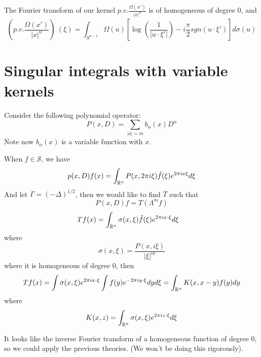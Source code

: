 \begin{theorem}
    The Fourier transform of our kernel $p.v.\frac{\Omega(x')}{|x|^n}$ is of homogeneous of degree 0, and
    \begin{equation*}
        \left(p.v.\frac{\Omega(x')}{|x|^n}\right)^{\widehat{\phantom{.}}}(\xi)=\int_{S^{n-1}}\Omega(u)\left[\log\left(\frac{1}{|u\cdot\xi'|}\right)-i\frac{\pi}{2}sgn(u\cdot\xi')\right]d\sigma(u)
    \end{equation*}
\end{theorem}



\section{Singular integrals with variable kernels}
Consider the following polynomial operator:
\begin{equation*}
    P(x,D)=\sum_{|a|=m}b_\alpha(x) D^\alpha
\end{equation*}
Note now $b_\alpha(x)$ is a variable function with $x$.

When $f\in\mathcal{S}$, we have
\begin{equation*}
    p(x,D)f(x)=\int_{\mathbb{R}^n}P(x,2\pi i\xi)\hat{f}(\xi)e^{2\pi ix\xi}d\xi
\end{equation*}
And let $\Gamma=(-\Delta)^{1/2}$, then we would like to find $T$ such that
\begin{equation*}
    P(x,D)f=T(\Lambda^mf)
\end{equation*}
\begin{align*}
    Tf(x)&=\int_{\mathbb{R}^n}\sigma(x,\xi)\hat{f}(\xi)e^{2\pi ix\cdot\xi}d\xi
\end{align*}
where
\begin{equation*}
    \sigma(x,\xi)=\frac{P(x,i\xi)}{|\xi|^m}
\end{equation*}
where it is homogeneous of degree 0, then 
\begin{equation*}
    Tf(x)=\int\sigma(x,\xi)e^{2\pi ix\cdot\xi}\int f(y)e^{-2\pi iy\cdot\xi}dyd\xi=\int_{\mathbb{R}^n}K(x,x-y)f(y)dy
\end{equation*}
where
\begin{equation*}
    K(x,z)=\int_{\mathbb{R}^n}\sigma(x,\xi)e^{2\pi iz\cdot\xi}d\xi
\end{equation*}
\begin{note}
    It looks like the inverse Fourier transform of a homogeneous function of degree 0, so we could apply the previous theories. (We won't be doing this rigorously).
\end{note}


